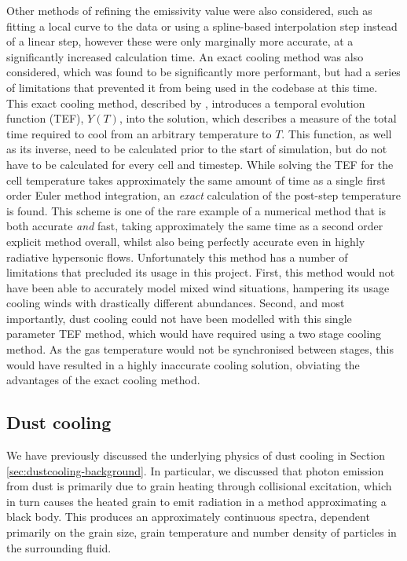 Other methods of refining the emissivity value were also considered, such as fitting a local curve to the data or using a spline-based interpolation step instead of a linear step, however these were only marginally more accurate, at a significantly increased calculation time. 
An exact cooling method was also considered, which was found to be significantly more performant, but had a series of limitations that prevented it from being used in the codebase at this time.
This exact cooling method, described by \textcite{townsendExactIntegrationScheme2009}, introduces a temporal evolution function (TEF), $Y(T)$, into the solution, which describes a measure of the total time required to cool from an arbitrary temperature to $T$.
This function, as well as its inverse, need to be calculated prior to the start of simulation, but do not have to be calculated for every cell and timestep.
While solving the TEF for the cell temperature takes approximately the same amount of time as a single first order Euler method integration, an \emph{exact} calculation of the post-step temperature is found.
This scheme is one of the rare example of a numerical method that is both accurate \emph{and} fast, taking approximately the same time as a second order explicit method overall, whilst also being perfectly accurate even in highly radiative hypersonic flows.
Unfortunately this method has a number of limitations that precluded its usage in this project.
First, this method would not have been able to accurately model mixed wind situations, hampering its usage cooling winds with drastically different abundances.
Second, and most importantly, dust cooling could not have been modelled with this single parameter TEF method, which would have required using a two stage cooling method.
As the gas temperature would not be synchronised between stages, this would have resulted in a highly inaccurate cooling solution, obviating the advantages of the exact cooling method.

\subsection{Dust cooling}
\label{sec:dustcoolingmodel}


We have previously discussed the underlying physics of dust cooling in Section \ref{sec:dustcooling-background}.
In particular, we discussed that photon emission from dust is primarily due to grain heating through collisional excitation, which in turn causes the heated grain to emit radiation in a method approximating a black body.
This produces an approximately continuous spectra, dependent primarily on the grain size, grain temperature and number density of particles in the surrounding fluid.

